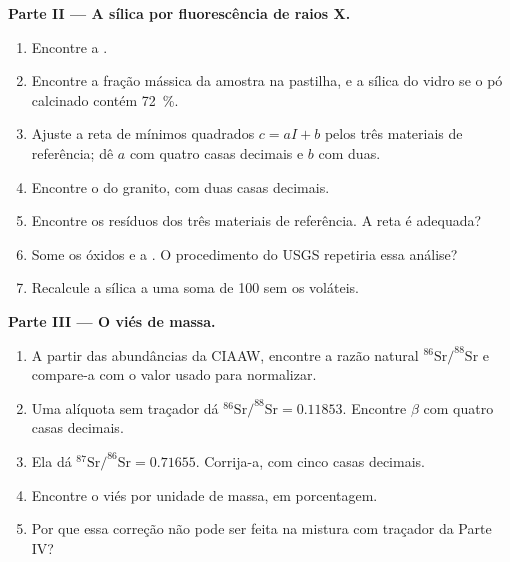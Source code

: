 \begin{problem}
\noindent\textbf{Parte II --- A sílica por fluorescência de raios X.}
\begin{enumerate}[resume]
  \item Encontre a .
  \item Encontre a fração mássica da amostra na pastilha, e a sílica do vidro se o
        pó calcinado contém \qty{72}{\percent}.
  \item Ajuste a reta de mínimos quadrados $c = aI + b$ pelos três materiais de referência; dê $a$ com
        quatro casas decimais e $b$ com duas.
  \item Encontre o  do granito, com duas casas decimais.
  \item Encontre os resíduos dos três materiais de referência. A reta é adequada?
  \item Some os óxidos e a . O procedimento do USGS repetiria essa análise?
  \item Recalcule a sílica a uma soma de 100 sem os voláteis.
\end{enumerate}

\noindent\textbf{Parte III --- O viés de massa.}
\begin{enumerate}[resume]
  \item A partir das abundâncias da CIAAW, encontre a razão natural $^{86}\mathrm{Sr}/^{88}\mathrm{Sr}$ e compare-a
        com o valor usado para normalizar.
  \item Uma alíquota sem traçador dá $^{86}\mathrm{Sr}/^{88}\mathrm{Sr} = 0.11853$. Encontre $\beta$ com
        quatro casas decimais.
  \item Ela dá $^{87}\mathrm{Sr}/^{86}\mathrm{Sr} = 0.71655$. Corrija-a, com cinco casas decimais.
  \item Encontre o viés por unidade de massa, em porcentagem.
  \item Por que essa correção não pode ser feita na mistura com traçador da Parte IV?
\end{enumerate}


\end{problem}
